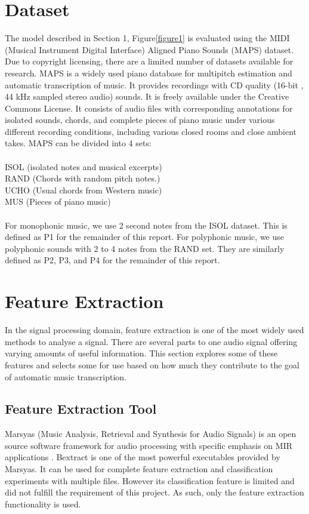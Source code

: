 \documentclass{article}
\begin{document}
 
%
\section{Dataset}\label{sec:Dataset}
The model described in Section 1, Figure\ref{figure1} is evaluated using the MIDI (Musical Instrument Digital Interface)  Aligned Piano Sounds (MAPS) dataset\cite{Emiya2010-ki}. Due to copyright licensing, there are a limited number of datasets available for research. MAPS is a widely used piano database for multipitch estimation and automatic transcription of music. It provides recordings with CD quality (16-bit , 44 kHz sampled stereo audio) sounds. It is freely available under the Creative Commons License. It consists of audio files with corresponding annotations for isolated sounds, chords, and complete pieces of piano music under various different recording conditions, including various closed rooms and close ambient takes. MAPS can be divided into 4 sets: \\\\
ISOL (isolated notes and musical excerpts)\\
RAND (Chords with random pitch notes.)\\
UCHO (Usual chords from Western music)\\
MUS (Pieces of piano music)\\\\
For monophonic music, we use 2 second notes from the ISOL dataset. This is defined as P1 for the remainder of this report. For polyphonic music, we use polyphonic sounds with 2 to 4 notes from the RAND set. They are similarly defined as P2, P3, and P4 for the remainder of this report.
\section{Feature Extraction}\label{sec:features}
In the signal processing domain, feature extraction is one of the most widely used methods to analyse a signal. There are several parts to one audio signal offering varying amounts of useful information. This section explores some of these features and selects some for use based on how much they contribute to the goal of automatic music transcription.
\subsection{Feature Extraction Tool}
Marsyas (Music Analysis, Retrieval and Synthesis for Audio Signals) is an open source software framework for audio processing with specific emphasis on MIR applications \cite{Tzanetakis2000-xp}. Bextract is one of the most powerful executables provided by Marsyas. It can be used for complete feature extraction and classification experiments with multiple files. However its classification feature is limited and did not fulfill the requirement of this project. As such, only the feature extraction functionality is used.
\end{document}
